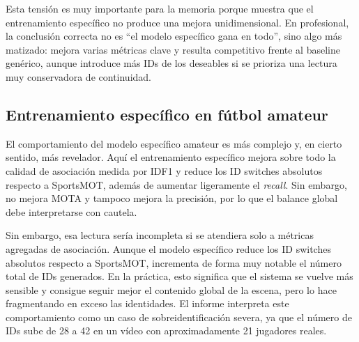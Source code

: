 \documentclass[../MAIN.tex]{subfiles}
\begin{document}
	Esta tensión es muy importante para la memoria porque muestra que el entrenamiento específico no produce una mejora unidimensional. En profesional, la conclusión correcta no es ``el modelo específico gana en todo'', sino algo más matizado: mejora varias métricas clave y resulta competitivo frente al baseline genérico, aunque introduce más IDs de los deseables si se prioriza una lectura muy conservadora de continuidad.
	
	\begin{table}[H]
		\centering
		\caption{Comparación entre SportsMOT y el modelo específico profesional.}
		\label{tab:cap11_profesional}
	\end{table}
	
	\subsection{Entrenamiento específico en fútbol amateur}
	
	El comportamiento del modelo específico amateur es más complejo y, en cierto sentido, más revelador. Aquí el entrenamiento específico mejora sobre todo la calidad de asociación medida por IDF1 y reduce los ID switches absolutos respecto a SportsMOT, además de aumentar ligeramente el \textit{recall}. Sin embargo, no mejora MOTA y tampoco mejora la precisión, por lo que el balance global debe interpretarse con cautela.
	
	Sin embargo, esa lectura sería incompleta si se atendiera solo a métricas agregadas de asociación. Aunque el modelo específico reduce los ID switches absolutos respecto a SportsMOT, incrementa de forma muy notable el número total de IDs generados. En la práctica, esto significa que el sistema se vuelve más sensible y consigue seguir mejor el contenido global de la escena, pero lo hace fragmentando en exceso las identidades. El informe interpreta este comportamiento como un caso de sobreidentificación severa, ya que el número de IDs sube de 28 a 42 en un vídeo con aproximadamente 21 jugadores reales.
	
\end{document}
